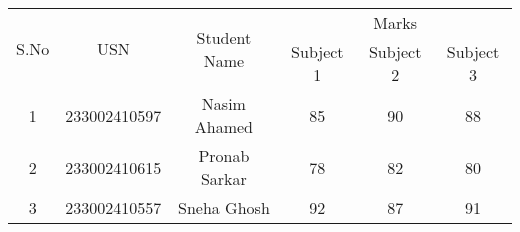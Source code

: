 \documentclass{article}
\begin{document}
\begin{table}[h!]
\centering
\begin{tabular}{|c|c|c|c|c|c|}
\hline
\multirow{2}{*}{S.No} & \multirow{2}{*}{USN} & \multirow{2}{*}{Student Name} & \multicolumn{3}{c|}{Marks} \\ \cline{4-6} 
                      &                      &                               & Subject 1 & Subject 2 & Subject 3 \\ \hline
1                     & 233002410597                &  Nasim Ahamed                     & 85        & 90        & 88        \\ \hline
2                     & 233002410615                & Pronab Sarkar                    & 78        & 82        & 80        \\ \hline
3                     & 233002410557               &  Sneha Ghosh                & 92        & 87        & 91        \\ \hline
\end{tabular}
\label{tab:student_marks}
\end{table}
\end{document}
